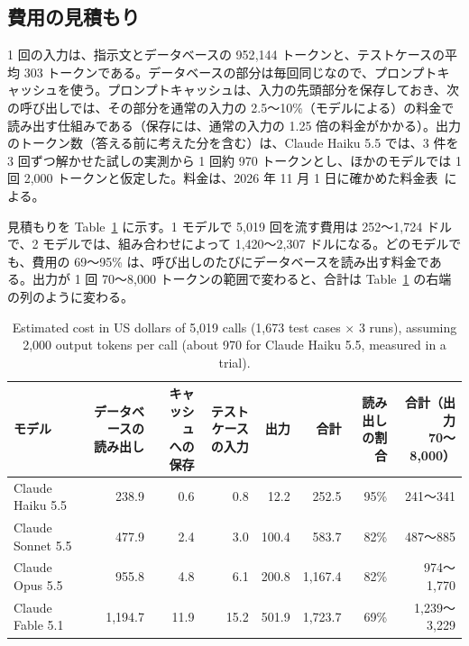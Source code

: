 \documentclass[a4j,dvipdfmx,10pt]{jresume}
\begin{document}
\subsection{費用の見積もり}\label{sec:cost}
1 回の入力は、指示文とデータベースの 952{,}144 トークンと、テストケースの平均 303 トークンである。データベースの部分は毎回同じなので、プロンプトキャッシュを使う。プロンプトキャッシュは、入力の先頭部分を保存しておき、次の呼び出しでは、その部分を通常の入力の 2.5〜10\%（モデルによる）の料金で読み出す仕組みである（保存には、通常の入力の 1.25 倍の料金がかかる）。出力のトークン数（答える前に考えた分を含む）は、Claude Haiku 5.5 では、3 件を 3 回ずつ解かせた試しの実測から 1 回約 970 トークンとし、ほかのモデルでは 1 回 2{,}000 トークンと仮定した。料金は、2026 年 11 月 1 日に確かめた料金表~\citep{AnthropicPricing}による。

見積もりを Table~\ref{tab:cost} に示す。1 モデルで 5{,}019 回を流す費用は 252〜1{,}724 ドルで、2 モデルでは、組み合わせによって 1{,}420〜2{,}307 ドルになる。どのモデルでも、費用の 69〜95\% は、呼び出しのたびにデータベースを読み出す料金である。出力が 1 回 70〜8{,}000 トークンの範囲で変わると、合計は Table~\ref{tab:cost} の右端の列のように変わる。

\begin{table}[t]\centering
\footnotesize
\caption{Estimated cost in US dollars of 5,019 calls (1,673 test cases $\times$ 3 runs), assuming 2,000 output tokens per call (about 970 for Claude Haiku 5.5, measured in a trial).}
\label{tab:cost}
\setlength{\tabcolsep}{5pt}
\begin{tabular}{@{}lrrrrrrr@{}}
\toprule
モデル & \shortstack{データベースの\\読み出し} & \shortstack{キャッシュ\\への保存} & \shortstack{テストケース\\の入力} & 出力 & 合計 & \shortstack{読み出し\\の割合} & \shortstack{合計（出力\\70〜8{,}000）} \\
\midrule
Claude Haiku 5.5 & 238.9 & 0.6 & 0.8 & 12.2 & 252.5 & 95\% & 241〜341 \\
Claude Sonnet 5.5 & 477.9 & 2.4 & 3.0 & 100.4 & 583.7 & 82\% & 487〜885 \\
Claude Opus 5.5 & 955.8 & 4.8 & 6.1 & 200.8 & 1{,}167.4 & 82\% & 974〜1{,}770 \\
Claude Fable 5.1 & 1{,}194.7 & 11.9 & 15.2 & 501.9 & 1{,}723.7 & 69\% & 1{,}239〜3{,}229 \\
\bottomrule
\end{tabular}
\end{table}
\end{document}
